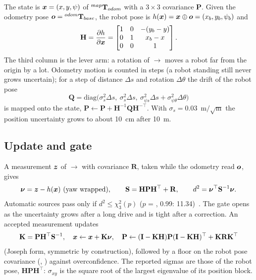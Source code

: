 The state is $\boldsymbol{x} = (x, y, \psi)$ of ${}^{map}\mathbf{T}_{odom}$ with a $3\times3$ covariance
$\mathbf{P}$. Given the odometry pose $\boldsymbol{o} = {}^{odom}\mathbf{T}_{base}$, the robot pose is
$h(\boldsymbol{x}) = \boldsymbol{x} \oplus \boldsymbol{o} = (x_b, y_b, \psi_b)$ and
\begin{equation}
  \mathbf{H} = \frac{\partial h}{\partial \boldsymbol{x}} =
  \begin{bmatrix} 1 & 0 & -(y_b - y) \\ 0 & 1 & x_b - x \\ 0 & 0 & 1 \end{bmatrix}.
\end{equation}
The third column is the lever arm: a rotation of $\to$ moves a robot far from
the  origin by a lot. Odometry motion is counted in steps (a robot standing still
never grows uncertain); for a step of distance $\Delta s$ and rotation $\Delta\theta$ the drift
of the robot pose
\begin{equation}
  \mathbf{Q} = \mathrm{diag}\big(\sigma_s^2\Delta s,\ \sigma_s^2\Delta s,\ \sigma_{\psi s}^2
  \Delta s + \sigma_{\psi\theta}^2 \Delta\theta\big)
\end{equation}
is mapped onto the state, $\mathbf{P} \leftarrow \mathbf{P} + \mathbf{H}^{-1}\mathbf{Q}
\mathbf{H}^{-\top}$. With $\sigma_s = 0.03$~m$/\sqrt{\mathrm{m}}$ the position uncertainty
grows to about 10~cm after 10~m.

\subsection{Update and gate}

A measurement $\boldsymbol{z}$ of $\to$ with covariance $\mathbf{R}$, taken
while the odometry read $\boldsymbol{o}$, gives
\begin{equation}
  \boldsymbol{\nu} = \boldsymbol{z} - h(\boldsymbol{x})\ (\text{yaw wrapped}), \qquad
  \mathbf{S} = \mathbf{H}\mathbf{P}\mathbf{H}^\top + \mathbf{R}, \qquad
  d^2 = \boldsymbol{\nu}^\top\mathbf{S}^{-1}\boldsymbol{\nu}.
\end{equation}
Automatic sources pass only if $d^2 \le \chi^2_3(p)$ ($p$ = ,
0.99: 11.34)~\cite{barshalom2001estimation}. The gate opens as the uncertainty grows after a
long drive and is tight after a correction. An accepted measurement updates
\begin{equation}
  \mathbf{K} = \mathbf{P}\mathbf{H}^\top\mathbf{S}^{-1}, \quad
  \boldsymbol{x} \leftarrow \boldsymbol{x} + \mathbf{K}\boldsymbol{\nu}, \quad
  \mathbf{P} \leftarrow (\mathbf{I} - \mathbf{K}\mathbf{H})\mathbf{P}(\mathbf{I} -
  \mathbf{K}\mathbf{H})^\top + \mathbf{K}\mathbf{R}\mathbf{K}^\top
\end{equation}
(Joseph form, symmetric by construction), followed by a floor on the robot pose covariance
(, ) against overconfidence. The reported sigmas are
those of the robot pose, $\mathbf{H}\mathbf{P}\mathbf{H}^\top$: $\sigma_{xy}$ is the square
root of the largest eigenvalue of its position block.

